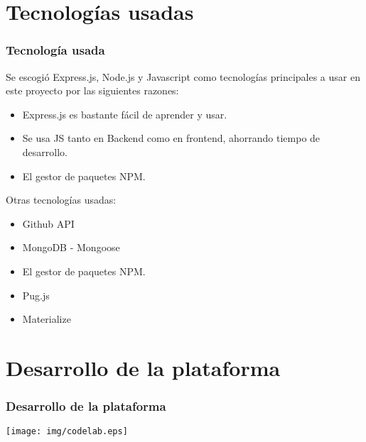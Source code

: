 \documentclass{beamer}
\begin{document}
\section{Tecnologías usadas}
\begin{frame}
  \frametitle{Tecnología usada}
  
  Se escogió Express.js, Node.js y Javascript como tecnologías principales a usar en este proyecto 
  por las siguientes razones:

  \begin{itemize}
    \item Express.js es bastante fácil de aprender y usar.
    \item Se usa JS tanto en Backend como en frontend, ahorrando tiempo de desarrollo.
    \item El gestor de paquetes NPM.
  \end{itemize}

  \framebreak

  Otras tecnologías usadas:

  \begin{itemize}
    \item Github API
    \item MongoDB - Mongoose
    \item El gestor de paquetes NPM.
    \item Pug.js
    \item Materialize
  \end{itemize}

\end{frame}


\section{Desarrollo de la plataforma}
\begin{frame}
\frametitle{Desarrollo de la plataforma}
  
  \begin{center}
    \texttt{[image: img/codelab.eps]}
  \end{center}

\end{frame}
\end{document}
